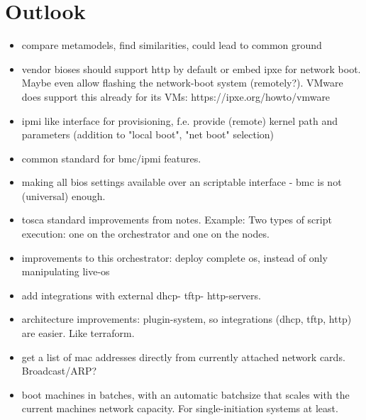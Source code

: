 \chapter{Outlook}



\begin{itemize}
  \item compare metamodels, find similarities, could lead to common ground
  \item vendor bioses should support http by default or embed ipxe for network boot. Maybe even allow flashing the network-boot system (remotely?). VMware does support this already for its VMs: https://ipxe.org/howto/vmware
  \item ipmi like interface for provisioning, f.e. provide (remote) kernel path and parameters (addition to "local boot", "net boot" selection)
  \item common standard for bmc/ipmi features.
  \item making all bios settings available over an scriptable interface - bmc is not (universal) enough.
  \item tosca standard improvements from notes. Example: Two types of script execution: one on the orchestrator and one on the nodes.
  \item improvements to this orchestrator: deploy complete os, instead of only manipulating live-os
  \item add integrations with external dhcp- tftp- http-servers.
  \item architecture improvements: plugin-system, so integrations (dhcp, tftp, http) are easier. Like terraform.
  \item get a list of mac addresses directly from currently attached network cards. Broadcast/ARP?
  \item boot machines in batches, with an automatic batchsize that scales with the current machines network capacity. For single-initiation systems at least.
\end{itemize}
